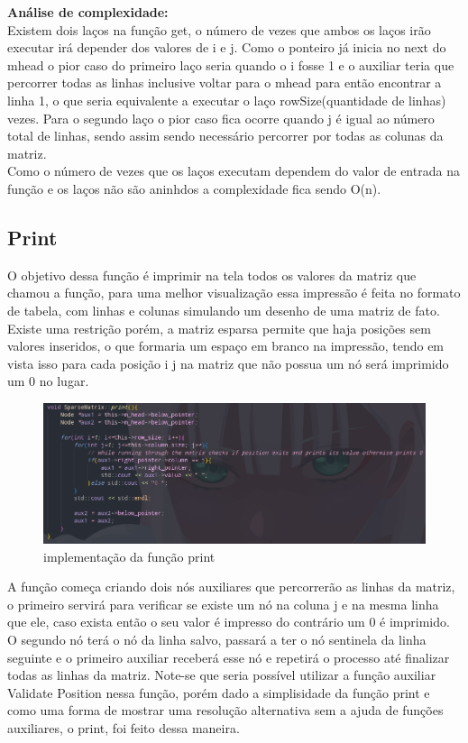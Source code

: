 \documentclass[a4paper,12pt]{article}
\begin{document}
\textbf{Análise de complexidade:} \\
Existem dois laços na função get, o número de vezes que ambos os laços irão executar irá depender dos valores de i e j. Como o ponteiro já inicia no next do mhead o pior caso do primeiro laço seria quando o i fosse 1 e o auxiliar teria que percorrer todas as linhas inclusive voltar para o mhead para então encontrar a linha 1, o que seria equivalente a executar o laço rowSize(quantidade de linhas) vezes.
Para o segundo laço o pior caso fica ocorre quando j é igual ao número total de linhas, sendo assim sendo necessário percorrer por todas as colunas da matriz.\\
Como o número de vezes que os laços executam dependem do valor de entrada na função e os laços não são aninhdos a complexidade fica sendo O(n).

\subsection{Print}
O objetivo dessa função é imprimir na tela todos os valores da matriz que chamou a função, para uma melhor visualização essa impressão é feita no formato de tabela, com linhas e colunas simulando um desenho de uma matriz de fato. Existe uma restrição porém, a matriz esparsa permite que haja posições sem valores inseridos, o que formaria um espaço em branco na impressão, tendo em vista isso para cada posição i j na matriz que não possua um nó será imprimido um 0 no lugar.

\begin{figure}[h]
\centering
\includegraphics[width=1\textwidth]{Imagens/sparsematrixCPP/sparsematrix-print.png}
\caption{\label{fig:print} implementação da função print}
\end{figure}

A função começa criando dois nós auxiliares que percorrerão as linhas da matriz, o primeiro servirá para verificar se existe um nó na coluna j e na mesma linha que ele, caso exista então o seu valor é impresso do contrário um 0 é imprimido. O segundo nó terá o nó da linha salvo, passará a ter o nó sentinela da linha seguinte e o primeiro auxiliar receberá esse nó e repetirá o processo até finalizar todas as linhas da matriz.
Note-se que seria possível utilizar a função auxiliar Validate Position nessa função, porém dado a simplisidade da função print e como uma forma de mostrar uma resolução alternativa sem a ajuda de funções auxiliares, o print, foi feito dessa maneira.
\end{document}
